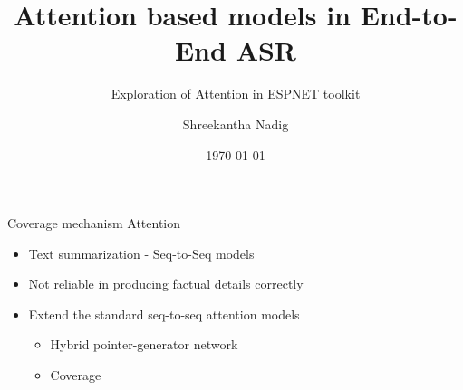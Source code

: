\documentclass{beamer}
\title{Attention based models in End-to-End ASR}
\subtitle{Exploration of Attention in ESPNET toolkit}
\date{\today}
\author{Shreekantha Nadig}
\institute{International Institute of Information Technology - Bangalore}
\begin{document}


\begin{frame}[fragile]{Coverage mechanism Attention}
\begin{center}
	\begin{itemize}
		\item Text summarization - Seq-to-Seq models
		\item Not reliable in producing factual details correctly
		\item Extend the standard seq-to-seq attention models
		\begin{itemize}
			\item Hybrid pointer-generator network
			\item Coverage
		\end{itemize} 
	\end{itemize} 
\end{center}
\end{frame}
\end{document}
